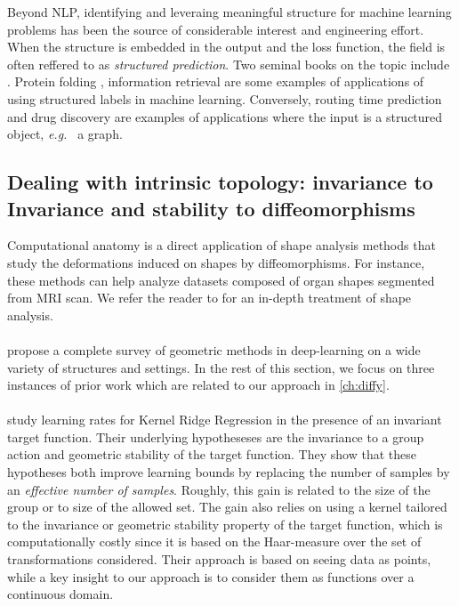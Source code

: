 Beyond NLP, identifying and leveraing meaningful structure for machine learning problems has been the source of considerable interest and engineering effort. When the structure is embedded in the output and the loss function, the field is often reffered to as \emph{structured prediction}. Two seminal books on the topic include \cite{advancedStructuredPrediction2014MIT,bakir2007predicting}. Protein folding  \citep{alphafold}, information retrieval \citep{duchi2010} are some examples of applications of using structured labels in machine learning. Conversely, routing time prediction \citep{deepmind-traffic} and drug discovery \citep{stokes-antibiotics} are examples of applications where the input is a structured object, \emph{e.g.\ } a graph.

\subsection{Dealing with intrinsic topology: invariance to Invariance and stability to diffeomorphisms}

Computational anatomy is a direct application of shape analysis methods that study the deformations induced on shapes by diffeomorphisms. For instance, these methods can help analyze datasets composed of organ shapes segmented from MRI scan. We refer the reader to \citet{younes} for an in-depth treatment of shape analysis.

\paragraph{}
\citet{bronstein} propose a complete survey of geometric methods in deep-learning on a wide variety of structures and settings. In the rest of this section, we focus on three instances of prior work which are related to our approach in \cref{ch:diffy}.

\paragraph{}
\citet{bietti} study learning rates for Kernel Ridge Regression in the presence of an invariant target function. Their underlying hypotheseses are the invariance to a group action and geometric stability of the target function. They show that these hypotheses both improve learning bounds by replacing the number of samples by an \emph{effective number of samples}. Roughly, this gain is related to the size of the group or to size of the allowed set. The gain also relies on using a kernel tailored to the invariance or geometric stability property of the target function, which is computationally costly since it is based on the Haar-measure over the set of transformations considered. Their approach is based on seeing data as points, while a key insight to our approach is to consider them as functions over a continuous domain.

